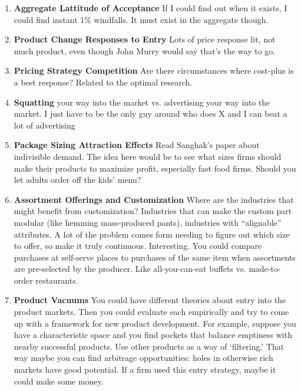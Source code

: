 \documentclass[paper=a4, fontsize=11pt]{scrartcl} %
\numberwithin{equation}{section} %
\numberwithin{figure}{section} %
\numberwithin{table}{section} %
\begin{document}
\begin{enumerate}

\item \textbf{Aggregate Lattitude of Acceptance}  If I could find out when it exists, I could find instant 1\% windfalls.  It must exist in the aggregate though. 

\item \textbf{Product Change Responses to Entry} Lots of price response lit, not much product, even though John Murry would say that's the way to go.

\item \textbf{Pricing Strategy Competition}  Are there circumstances where cost-plus is a best response?  Related to the optimal research.  

\item \textbf{Squatting} your way into the market vs. advertising your way into the market.  I just have to be the only guy around who does X and I can beat a lot of advertising

\item \textbf{Package Sizing Attraction Effects} Read Sanghak's paper about indivisible demand.  The idea here would be to see what sizes firms should make their products to maximize profit, especially fast food firms.  Should you let adults order off the kids' menu?

\item \textbf{Assortment Offerings and Customization}  Where are the industries that might benefit from customization?  Industries that can make the custom part modular (like hemming mass-produced pants), industries with ``alignable'' attributes.  A lot of the problem comes form needing to figure out which size to offer, so make it truly continuous.  Interesting.  You could compare purchases at self-serve places to purchases of the same item when assortments are pre-selected by the producer.  Like all-you-can-eat buffets vs. made-to-order restaurants.  

\item \textbf{Product Vacuums}  You could have different theories about entry into the product markets.  Then you could evaluate each empirically and try to come up with a framework for new product development.  For example, suppose you have a characteristic space and you find pockets that balance emptiness with nearby successful products.  Use other products as a way of `filtering.'  That way maybe you can find arbitrage opportunities: holes in otherwise rich markets have good potential.  If a firm used this entry strategy, maybe it could make some money.


\end{enumerate}
\end{document}
